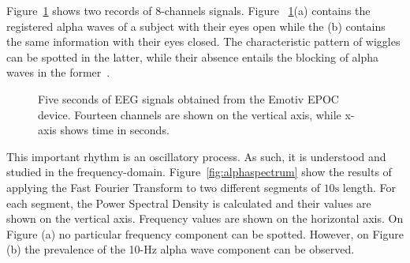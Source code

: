 Figure~\ref{fig:alphawavessignals} shows two records of 8-channels signals.  Figure ~\ref{fig:alphawavessignals}(a) contains the registered alpha waves of a subject with their eyes open while the (b) contains the same information with their eyes closed.  The characteristic pattern of wiggles can be spotted in the latter, while their absence entails the blocking of alpha waves in the former~\cite{Basar2012}. 

\begin{figure}[h!]
\centering
{}
\caption[Alpha Waves Wiggles]{Five seconds of EEG signals obtained from the Emotiv EPOC device.  Fourteen channels are shown on the vertical axis, while x-axis shows time in seconds.}
\label{fig:alphawavessignals}
\end{figure}

This important rhythm is an oscillatory process.  As such, it is understood and studied in the frequency-domain.   Figure~\ref{fig:alphaspectrum} show the results of applying the Fast Fourier Transform to two different segments of $10\si{\second}$ length.  For each segment, the Power Spectral Density is calculated and their values are shown on the vertical axis.  Frequency values are shown on the horizontal axis.   On Figure (a) no particular frequency component can be spotted.  However, on Figure (b) the prevalence of the 10-\si{\hertz} alpha wave component can be observed.   
 
